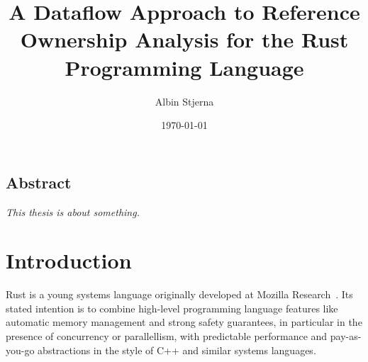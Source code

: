 \documentclass{UUThesisTemplate}
\author{Albin Stjerna}
\date{\today}
\title{A Dataflow Approach to Reference Ownership Analysis for the Rust Programming Language}
\newcommand{\fixme}[1] {{\color{red}#1}}
\begin{document}


\maketitle

\section*{Abstract}
\textit{\fixme{This thesis is about something.}}


\begingroup
  \tableofcontents
  \listoffigures
\endgroup
  

\chapter{Introduction}

Rust is a young systems language originally developed at Mozilla
Research~\cite{matsakis_rust_2014}. Its stated intention is to combine
high-level programming language features like automatic memory management and
strong safety guarantees, in particular in the presence of concurrency or
parallellism, with predictable performance and pay-as-you-go abstractions in the
style of C++ and similar systems languages.
\end{document}
